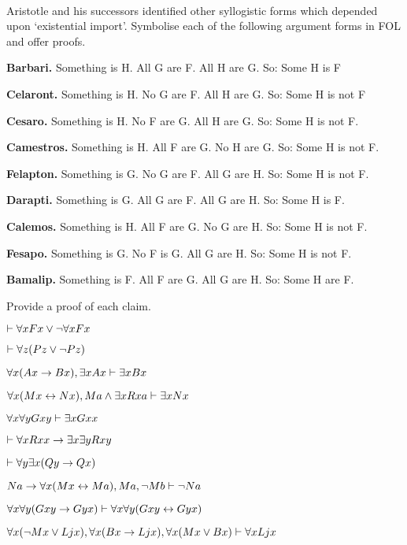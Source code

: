 \

\problempart
\label{pr.BarbaraEtc.proof2}
Aristotle and his successors identified other syllogistic forms which depended upon `existential import'. Symbolise each of the following argument forms in FOL and offer proofs.
\begin{ebullet}
	\item \textbf{Barbari.} Something is H. All G are F. All H are G. So: Some H is F
	\item \textbf{Celaront.} Something is H. No G are F. All H are G. So: Some H is not F
	\item \textbf{Cesaro.} Something is H. No F are G. All H are G. So: Some H is not F.
	\item \textbf{Camestros.} Something is H. All F are G. No H are G. So: Some H is not F.
	\item \textbf{Felapton.} Something is G. No G are F. All G are H. So: Some H is not F.
	\item \textbf{Darapti.} Something is G. All G are F. All G are H. So: Some H is F.
	\item \textbf{Calemos.} Something is H. All F are G. No G are H. So: Some H is not F.
	\item \textbf{Fesapo.} Something is G. No F is G. All G are H. So: Some H is not F.
	\item \textbf{Bamalip.} Something is F. All F are G. All G are H. So: Some H are F.
\end{ebullet}

\problempart
\label{pr.someFOLproofs}
Provide a proof of each claim.
\begin{earg}
\item $\vdash \forall x Fx \vee \neg \forall x Fx$
\item $\vdash\forall z (Pz \vee \neg Pz)$
\item $\forall x(Ax\rightarrow Bx), \exists x Ax \vdash \exists x Bx$
\item $\forall x(Mx \leftrightarrow Nx), Ma\wedge\exists x Rxa\vdash \exists x Nx$
\item $\forall x \forall y Gxy\vdash\exists x Gxx$
\item $\vdash\forall x Rxx\rightarrow \exists x \exists y Rxy$
\item $\vdash\forall y \exists x (Qy \rightarrow Qx)$
\item $Na \rightarrow \forall x(Mx \leftrightarrow Ma), Ma, \neg Mb\vdash \neg Na$
\item $\forall x \forall y (Gxy \rightarrow Gyx) \vdash \forall x\forall y (Gxy \leftrightarrow Gyx)$
\item $\forall x(\neg Mx \vee Ljx), \forall x(Bx\rightarrow Ljx), \forall x(Mx\vee Bx)\vdash \forall xLjx$
\end{earg}

